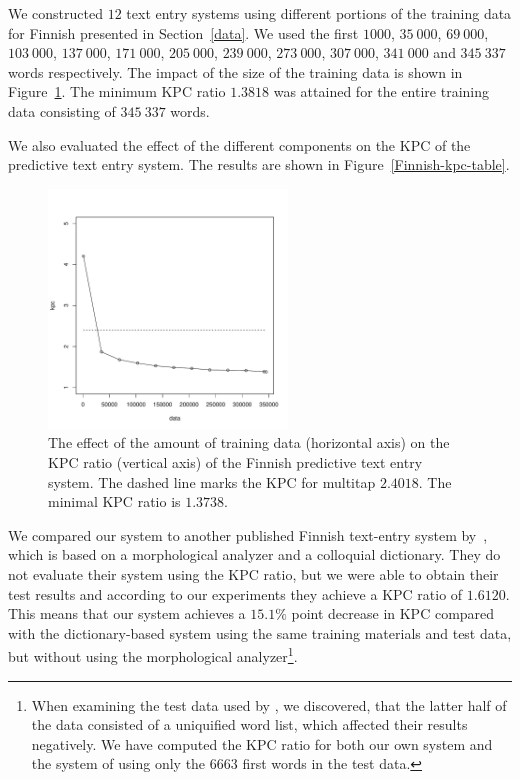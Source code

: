 \documentclass{llncs}
\begin{document}
We constructed $12$ text entry systems using different portions of the
training data for Finnish presented in Section~\ref{data}. We used the
first $1000$, $35\ 000$, $69\ 000$, $103\ 000$, $137\ 000$, $171\ 000$,
$205\ 000$, $239\ 000$, $273\ 000$, $307\ 000$, $341\ 000$ and $345\ 337$ words
respectively. The impact of the size of the training data is shown in
Figure~\ref{fi-kpc-graph}. The minimum KPC ratio $1.3818$ was attained
for the entire training data consisting of $345\ 337$ words.

We also evaluated the effect of the different components on the KPC of
the predictive text entry system. The results are shown in
Figure~\ref{Finnish-kpc-table}.

\begin{figure}[hbt!]
\begin{center}
\includegraphics[width=2.5in]{finnish_kpc_figure.pdf}
\end{center}
\caption{The effect of the amount of training data (horizontal axis)
  on the KPC ratio (vertical axis) of the Finnish predictive text
  entry system. The dashed line marks the KPC for
  multitap $2.4018$. The minimal KPC ratio is $1.3738$.}\label{fi-kpc-graph}
\end{figure}

We compared our system to another published Finnish text-entry system
by~\cite{silfverberg/2011/cla}, which is based on a morphological
analyzer and a colloquial dictionary. They do not evaluate their
system using the KPC ratio, but we were able to obtain their test
results and according to our experiments they achieve a KPC ratio of
$1.6120$. This means that our system achieves a $15.1\%$ point decrease in KPC
compared with the dictionary-based system using the same training
materials and test data, but without using the morphological
analyzer\footnote{When examining the test data used by
  \cite{silfverberg/2011/cla}, we discovered, that the latter half of
  the data consisted of a uniquified word list, which affected their
  results negatively. We have computed the KPC ratio for both our own
  system and the system of \cite{silfverberg/2011/cla} using only the
  $6663$ first words in the test data.}.
\end{document}
